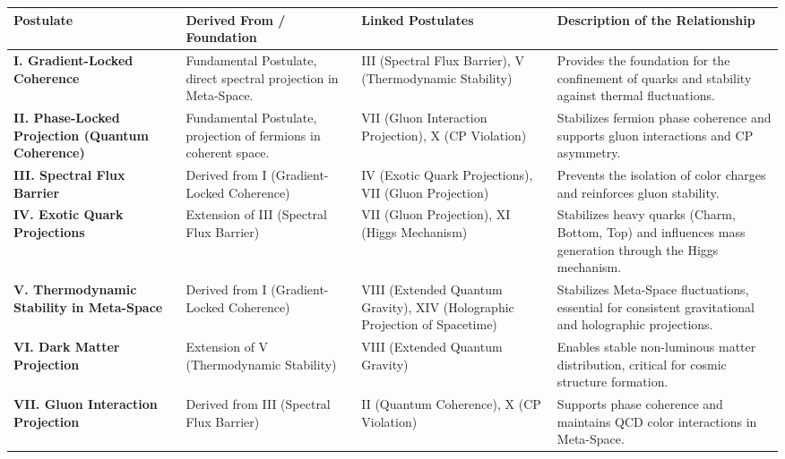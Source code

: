 \documentclass[10.5pt,a4paper]{article}
\begin{document}
\begin{landscape}

\begin{tabularx}{\linewidth}{>{\bfseries}X X X X}
\toprule
\textbf{Postulate} & \textbf{Derived From / Foundation} & \textbf{Linked Postulates} & \textbf{Description of the Relationship} \\
\midrule

\textbf{I. Gradient-Locked Coherence} &
Fundamental Postulate, direct spectral projection in Meta-Space. &
III (Spectral Flux Barrier), V (Thermodynamic Stability) &
Provides the foundation for the confinement of quarks and stability against thermal fluctuations. \\

\textbf{II. Phase-Locked Projection (Quantum Coherence)} &
Fundamental Postulate, projection of fermions in coherent space. &
VII (Gluon Interaction Projection), X (CP Violation) &
Stabilizes fermion phase coherence and supports gluon interactions and CP asymmetry. \\

\textbf{III. Spectral Flux Barrier} &
Derived from I (Gradient-Locked Coherence) &
IV (Exotic Quark Projections), VII (Gluon Projection) &
Prevents the isolation of color charges and reinforces gluon stability. \\

\textbf{IV. Exotic Quark Projections} &
Extension of III (Spectral Flux Barrier) &
VII (Gluon Projection), XI (Higgs Mechanism) &
Stabilizes heavy quarks (Charm, Bottom, Top) and influences mass generation through the Higgs mechanism. \\

\textbf{V. Thermodynamic Stability in Meta-Space} &
Derived from I (Gradient-Locked Coherence) &
VIII (Extended Quantum Gravity), XIV (Holographic Projection of Spacetime) &
Stabilizes Meta-Space fluctuations, essential for consistent gravitational and holographic projections. \\

\textbf{VI. Dark Matter Projection} &
Extension of V (Thermodynamic Stability) &
VIII (Extended Quantum Gravity) &
Enables stable non-luminous matter distribution, critical for cosmic structure formation. \\

\textbf{VII. Gluon Interaction Projection} &
Derived from III (Spectral Flux Barrier) &
II (Quantum Coherence), X (CP Violation) &
Supports phase coherence and maintains QCD color interactions in Meta-Space. \\


\end{tabularx}
\end{landscape}
\end{document}
